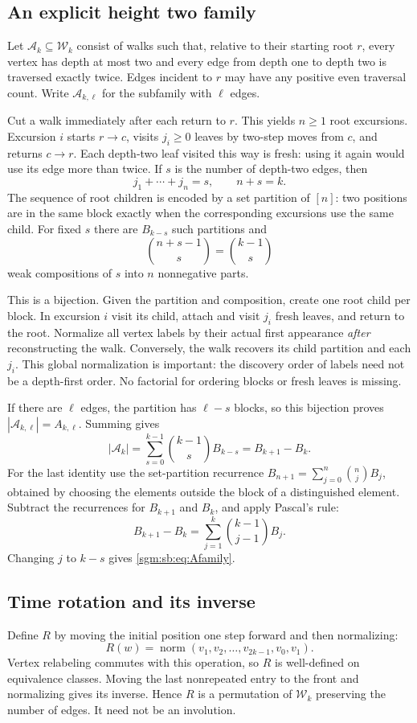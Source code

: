 \documentclass[11pt,letterpaper]{article}
\theoremstyle{remark}\newtheorem{remark}[theorem]{Remark}
\newcommand{\Wc}{\mathcal W}\newcommand{\Uc}{\mathcal U}\newcommand{\Part}{\operatorname{Part}}
\newcommand{\Ac}{\mathcal A}
\theoremstyle{definition}\newtheorem{definition}[theorem]{Definition}
\begin{document}
\subsection{An explicit height two family}
Let $\Ac_k\subseteq\Wc_k$ consist of walks such that, relative to their starting root $r$, every vertex has depth at most two and every edge from depth one to depth two is traversed exactly twice. Edges incident to $r$ may have any positive even traversal count. Write $\Ac_{k,\ell}$ for the subfamily with $\ell$ edges.

Cut a walk immediately after each return to $r$. This yields $n\ge1$ root excursions. Excursion $i$ starts $r\to c$, visits $j_i\ge0$ leaves by two-step moves from $c$, and returns $c\to r$. Each depth-two leaf visited this way is fresh: using it again would use its edge more than twice. If $s$ is the number of depth-two edges, then
\[
 j_1+\cdots+j_n=s,\qquad n+s=k.
\]
The sequence of root children is encoded by a set partition of $[n]$: two positions are in the same block exactly when the corresponding excursions use the same child. For fixed $s$ there are $B_{k-s}$ such partitions and
\[
 \binom{n+s-1}{s}=\binom{k-1}{s}
\]
weak compositions of $s$ into $n$ nonnegative parts.

This is a bijection. Given the partition and composition, create one root child per block. In excursion $i$ visit its child, attach and visit $j_i$ fresh leaves, and return to the root. Normalize all vertex labels by their actual first appearance \emph{after} reconstructing the walk. Conversely, the walk recovers its child partition and each $j_i$. This global normalization is important: the discovery order of labels need not be a depth-first order. No factorial for ordering blocks or fresh leaves is missing.

If there are $\ell$ edges, the partition has $\ell-s$ blocks, so this bijection proves $|\Ac_{k,\ell}|=A_{k,\ell}$. Summing gives
\begin{equation}\label{sgm:sb:eq:Afamily}
 |\Ac_k|=\sum_{s=0}^{k-1}\binom{k-1}{s}B_{k-s}=B_{k+1}-B_k.
\end{equation}
For the last identity use the set-partition recurrence
$B_{n+1}=\sum_{j=0}^n\binom nj B_j$, obtained by choosing the elements outside the block of a distinguished element. Subtract the recurrences for $B_{k+1}$ and $B_k$, and apply Pascal's rule:
\[
 B_{k+1}-B_k=\sum_{j=1}^k\binom{k-1}{j-1}B_j.
\]
Changing $j$ to $k-s$ gives \eqref{sgm:sb:eq:Afamily}.

\subsection{Time rotation and its inverse}
Define $R$ by moving the initial position one step forward and then normalizing:
\[
 R(w)=\operatorname{norm}(v_1,v_2,\ldots,v_{2k-1},v_0,v_1).
\]
Vertex relabeling commutes with this operation, so $R$ is well-defined on equivalence classes. Moving the last nonrepeated entry to the front and normalizing gives its inverse. Hence $R$ is a permutation of $\Wc_k$ preserving the number of edges. It need not be an involution.
\end{document}
